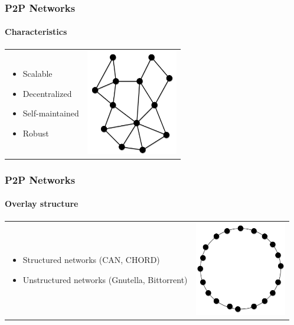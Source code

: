 \begin{frame}
\frametitle{P2P Networks}
\framesubtitle{Characteristics}
\begin{table}
\begin{tabular}{p{7cm}p{3cm}}
\begin{itemize}
  \item Scalable
  \item Decentralized
  \item Self-maintained
  \item Robust
\end{itemize}
&
\vspace{1.5cm}
\includegraphics[width=4cm]{img/p2p-unstructured}\\
\end{tabular}
\end{table}
\end{frame}

\begin{frame}
\frametitle{P2P Networks}
\framesubtitle{Overlay structure}
\begin{table}
\begin{tabular}{p{7cm}p{3cm}}
\begin{itemize}
    \item Structured networks (CAN, CHORD)
    \item Unstructured networks (Gnutella, Bittorrent)

\end{itemize}
&
\vspace{1.5cm}
\includegraphics[width=4cm]{img/p2p-structured}\\
\end{tabular}
\end{table}
\end{frame}

